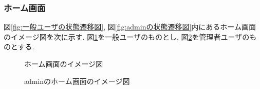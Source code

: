 \documentclass[11ptm]{jsarticle}
\begin{document}
\subsubsection{ホーム画面}
\label{subsubsec:ホーム画面}
図\ref{fig:一般ユーザの状態遷移図}, 図\ref{fig:adminの状態遷移図}内にあるホーム画面のイメージ図を次に示す. 図\ref{fig:ホーム画面のイメージ図}を一般ユーザのものとし, 図\ref{fig:adminのホーム画面のイメージ図}を管理者ユーザのものとする.
\begin{figure}[h]
  \centering
  \caption{\label{fig:ホーム画面のイメージ図}ホーム画面のイメージ図}
\end{figure}

\begin{figure}[h]
  \centering
  \caption{\label{fig:adminのホーム画面のイメージ図}adminのホーム画面のイメージ図}
\end{figure}


\clearpage
\end{document}
